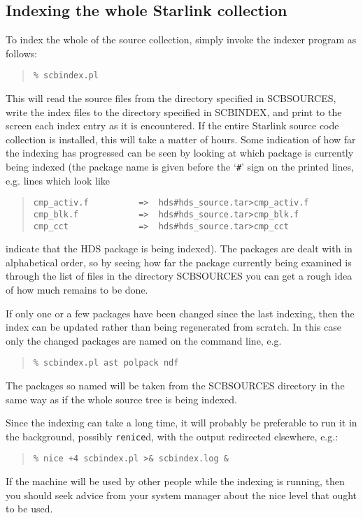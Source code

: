 \documentclass[twoside,11pt]{article}
\newcommand{\xlabel}[1]{}
\renewcommand{\_}{\texttt{\symbol{95}}}
\begin{document}
\subsection{\xlabel{sec:indexing-all}\label{sec:indexing-all}Indexing the whole Starlink collection}

To index the whole of the source collection, simply invoke the 
indexer program as follows:
\begin{quote}
\begin{verbatim}
% scbindex.pl
\end{verbatim}
\end{quote}
This will 
read the source files from the directory specified in SCB\_SOURCES, 
write the index files to the directory specified in SCB\_INDEX,
and print to the screen each index entry as it is encountered.
If the entire Starlink source code collection is installed, 
this will take a matter of hours.  Some indication of how far the indexing
has progressed can be seen by looking at which package is currently
being indexed (the package name is given before the `{\tt \#}' sign on the 
printed lines, e.g. lines which look like
\begin{quote}
\begin{verbatim}
cmp_activ.f          =>  hds#hds_source.tar>cmp_activ.f
cmp_blk.f            =>  hds#hds_source.tar>cmp_blk.f
cmp_cct              =>  hds#hds_source.tar>cmp_cct
\end{verbatim}
\end{quote}
indicate that the HDS package is being indexed).
The packages are dealt with in alphabetical order, so by seeing how 
far the package currently being examined is through the list of files
in the directory SCB\_SOURCES you can get a rough idea of how much remains
to be done.

If only one or a few packages have been changed
since the last indexing,
then the index can be updated rather than being regenerated from scratch.
In this case only the changed packages are named on the command line,
e.g.
\begin{quote}
\begin{verbatim}
% scbindex.pl ast polpack ndf
\end{verbatim}
\end{quote}
The packages so named will be taken from the SCB\_SOURCES directory in
the same way as if the whole source tree is being indexed.

Since the indexing can take a long time, it will probably be preferable to 
run it in the background, possibly {\tt renice}d, with the output
redirected elsewhere, e.g.:
\begin{quote}
\begin{verbatim}
% nice +4 scbindex.pl >& scbindex.log &
\end{verbatim}
\end{quote}
If the machine will be used by other people while the indexing 
is running, then you should seek advice from your system manager 
about the nice level that ought to be used.
\end{document}
